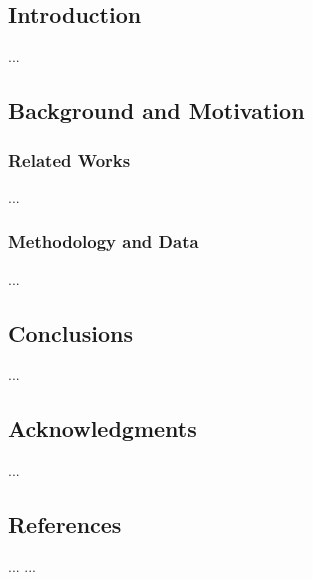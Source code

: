 \documentclass{acm_proc_article-sp}
\begin{document}
\subsection{Introduction}
...
\subsection{Background and Motivation}
\subsubsection{Related Works}
...
\subsubsection{Methodology and Data}
...
\subsection{Conclusions}
...
\subsection{Acknowledgments}
...

\subsection{References}
... ...

\balancecolumns
\end{document}
